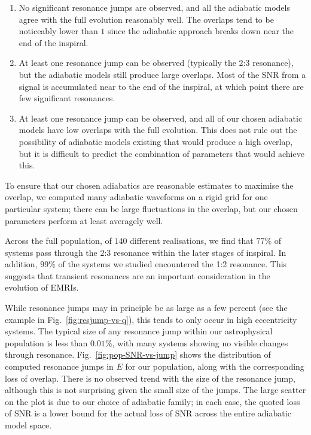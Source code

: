 \documentclass[aps,prd,amsfonts,amssymb,amsmath,nofootinbib,reprint,showpacs]{revtex4}
\newcommand{\figref}[1]{Fig.\ \ref{fig:#1}}
\newcommand{\Figref}[1]{Fig.\ \ref{fig:#1}}
\begin{document}
\begin{enumerate}
\item No significant resonance jumps are observed, and all the adiabatic models agree with the full evolution reasonably well. The overlaps tend to be noticeably lower than $1$ since the adiabatic approach breaks down near the end of the inspiral.

\item At least one resonance jump can be observed (typically the 2:3 resonance), but the adiabatic models still produce large overlaps. Most of the SNR from a signal is accumulated near to the end of the inspiral, at which point there are few significant resonances.

\item At least one resonance jump can be observed, and all of our chosen adiabatic models have low overlaps with the full evolution. This does not rule out the possibility of adiabatic models existing that would produce a high overlap, but it is difficult to predict the combination of parameters that would achieve this.
\end{enumerate}

To ensure that our chosen adiabatics are reasonable estimates to maximise the overlap, we computed many adiabatic waveforms on a rigid grid for one particular system; there can be large fluctuations in the overlap, but our chosen parameters perform at least averagely well.

Across the full population, of $140$ different realisations, we find that $77\%$ of systems pass through the 2:3 resonance within the later stages of inspiral. In addition, $99\%$ of the systems we studied encountered the 1:2 resonance. This suggests that transient resonances are an important consideration in the evolution of EMRIs.

While resonance jumps may in principle be as large as a few percent (see the example in \figref{resjump-vs-q}), this tends to only occur in high eccentricity systems. The typical size of any resonance jump within our astrophysical population is less than $0.01\%$, with many systems showing no visible changes through resonance. \Figref{pop-SNR-vs-jump} shows the distribution of computed resonance jumps in $E$ for our population, along with the corresponding loss of overlap. There is no observed trend with the size of the resonance jump, although this is not surprising given the small size of the jumps. The large scatter on the plot is due to our choice of adiabatic family; in each case, the quoted loss of SNR is a lower bound for the actual loss of SNR across the entire adiabatic model space.
\end{document}
